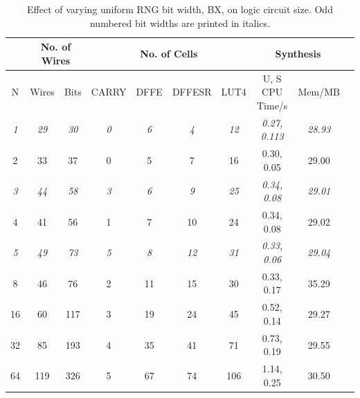 \documentclass[12pt]{article}
\begin{document}
      \begin{table}[H]
        \centering
        \begin{tabular}{|c||c|c|c|c|c|c|c|c|c|}
          \hline
          &
          \multicolumn{2}{|c|}{No. of Wires}
          &
          \multicolumn{4}{|c|}{No. of Cells}
          &
          \multicolumn{2}{|c|}{Synthesis}\\
          \hline
          N & Wires & Bits & CARRY & DFFE & DFFESR & LUT4 & U, S CPU Time/s & Mem/MB\\
          \hline
          \hline
          \textit{1} & \textit{29} & \textit{30} & \textit{0} & \textit{6} & \textit{4} & \textit{12} & \textit{0.27, 0.113} & \textit{28.93}\\
          \hline
          2 & 33 & 37 & 0 & 5 & 7 & 16 & 0.30, 0.05 & 29.00\\
          \hline
          \textit{3} & \textit{44} & \textit{58} & \textit{3} & \textit{6} & \textit{9} & \textit{25} & \textit{0.34, 0.08} & \textit{29.01}\\
          \hline
          4 & 41 & 56 & 1 & 7 & 10 & 24 & 0.34, 0.08 & 29.02\\
          \hline
          \textit{5} & \textit{49} & \textit{73} & \textit{5} & \textit{8} & \textit{12} & \textit{31} & \textit{0.33, 0.06} & \textit{29.04}\\
          \hline
          8 & 46 & 76 & 2 & 11 & 15 & 30 & 0.33, 0.17 & 35.29\\
          \hline
          16 & 60 & 117 & 3 & 19 & 24 & 45 & 0.52, 0.14 & 29.27\\
          \hline
          32 & 85 & 193 & 4 & 35 & 41 & 71 & 0.73, 0.19 & 29.55\\
          \hline
          64 & 119 & 326 & 5 & 67 & 74 & 106 & 1.14, 0.25 & 30.50\\
          \hline
        \end{tabular}
        \caption{Effect of varying uniform RNG bit width, BX, on logic circuit size. Odd numbered bit widths are printed in italics.}
        \label{table:urng_bx}
      \end{table}
\end{document}
